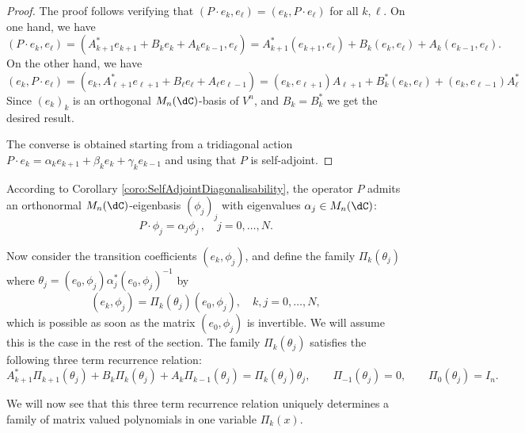 \documentclass[a4paper,reqno]{amsart}
\theoremstyle{definition}
\numberwithin{equation}{section}
\begin{document}
\begin{proof}
The proof follows verifying that $(P\cdot e_k, e_\ell)=(e_k, P \cdot e_\ell)$ for all $k, \ell.$ On one hand, we have
$$(P\cdot e_k, e_\ell)=(A_{k+1}^\ast e_{k+1} +B_k e_k + A_k e_{k-1},e_\ell)=A_{k+1}^\ast (e_{k+1},e_\ell) + B_k (e_k,e_\ell) +A_k(e_{k-1},e_\ell).$$
On the other hand, we have
$$( e_k, P\cdot e_\ell)=(e_k, A_{\ell+1}^\ast e_{\ell+1}+B_\ell e_\ell +A_\ell e_{\ell-1})= (e_{k},e_{\ell+1})A_{\ell+1} + B_k^\ast (e_k,e_\ell) +(e_{k},e_{\ell-1})A_{\ell}^\ast$$
Since $(e_k)_k$ is an orthogonal $M_n(\dC)$-basis of $V^n$, and $B_k=B_k^\ast$ we get the desired result. 

The converse is obtained starting from a tridiagonal action $P\cdot e_k=\alpha_k e_{k+1}+ \beta_k e_k +\gamma_k e_{k-1}$ and using that $P$ is self-adjoint. 
\end{proof}

According to Corollary \ref{coro:SelfAdjointDiagonalisability}, the operator $P$ admits an orthonormal $M_n(\dC)$-eigenbasis $(\phi_j)_j$ with eigenvalues $\alpha_j\in M_n(\dC)$:
\begin{equation}
    P\cdot \phi_j = \alpha_j\phi_j\,,\quad j=0,\ldots,N.
\end{equation}

Now consider the transition coefficients $( e_k,\phi_j)$, and define the family $\Pi_k(\theta_j)$ where $\theta_j=( e_0, \phi_j) {\alpha}_j^*( e_0, \phi_j)^{-1}$ by
\begin{equation}
\label{eq:transition-coef-general}
( e_k,\phi_j) =\Pi_k(\theta_j)( e_0, \phi_j),\quad k,j=0,\ldots,N,
\end{equation}
which is possible as soon as the matrix $( e_0, \phi_j)$ is invertible. 
We will assume this is the case in the rest of the section. The family $\Pi_k(\theta_j)$ satisfies the following three term recurrence relation:
\begin{equation}
\label{eq:recurrence-pi}
    A_{k+1}^*\Pi_{k+1}(\theta_j)+B_k\Pi_k(\theta_j)+A_k\Pi_{k-1}(\theta_j)=\Pi_k(\theta_j)\theta_j, \qquad \Pi_{-1}(\theta_j)=0,\qquad \Pi_0(\theta_j)=I_n.
\end{equation}

We will now see that this three term recurrence relation uniquely determines a family of matrix valued polynomials in one variable $\Pi_k(x)$.
\end{document}
